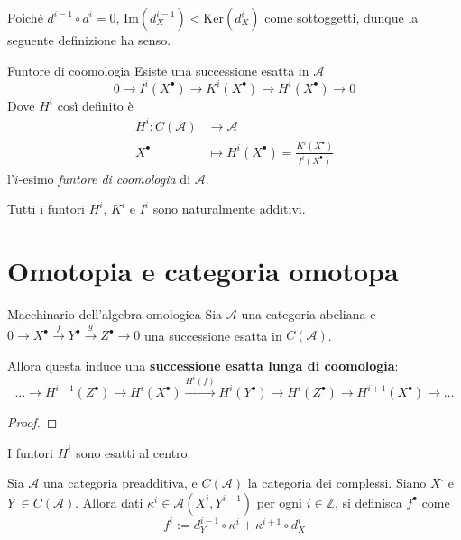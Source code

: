 Poiché \(d^{i-1} \circ d^{i} = 0\), \(\mathrm{Im}{(d_X^{i-1})} <
\mathrm{Ker}{(d_X^{i})}\) come sottoggetti, dunque la seguente definizione ha
senso.
\begin{definition}{Funtore di coomologia}
    Esiste una successione esatta in \(\mathcal{A}\) \[ 0 \to I^{i}{(X^\bullet)}
    \to K^{i}{(X^\bullet)} \to H^{i}{(X^\bullet)} \to 0\]
    Dove \(H^{i}\) così definito è
    \begin{align*}
        H^{i}: C{(\mathcal{A})} &\longrightarrow \mathcal{A} \\
        X^\bullet &\longmapsto H^{i}(X^\bullet) =
        \frac{K^{i}{(X^\bullet)}}{I^{i}{(X^\bullet)}}
    \end{align*}
    l'\(i\)-esimo \emph{funtore di coomologia} di \(\mathcal{A}\).
\end{definition}

\begin{proposition}{}
    Tutti i funtori \(H^{i}\), \(K^{i}\) e \(I^{i}\) sono naturalmente
    additivi.
\end{proposition}


\section{Omotopia e categoria omotopa}

\begin{theorem}{Macchinario dell'algebra omologica}\label{thm:LES}
    Sia \(\mathcal{A}\) una categoria abeliana e \(0 \to X^\bullet
    \overset{f}{\to} Y^\bullet \overset{g}{\to} Z^\bullet \to 0\) una
    successione esatta in \(C{(\mathcal{A})}\).

    Allora questa induce una \textbf{successione esatta lunga di coomologia}:
    \[
      \dots \to H^{i-1}{(Z^\bullet)} \to H^{i}{(X^\bullet)}
      \overset{H^{i}{(f)}}{\to} H^{i}{(Y^\bullet)} \to H^{i}{(Z^\bullet)} \to
      H^{i+1}{(X^\bullet)} \to \dots
    \]
\end{theorem}

\begin{proof}{}
\end{proof}

\begin{corollary}{}
    I funtori \(H^{i}\) sono esatti al centro.
\end{corollary}






Sia \(\mathcal{A}\) una categoria preadditiva, e \(C{(\mathcal{A})}\) la
categoria dei complessi. Siano \(X^{\cdot }\) e \(Y^{\cdot } \in
C{(\mathcal{A})}\). Allora dati \(\kappa^{i} \in \mathcal{A}{(X^{i}, Y^{i-1})}\)
per ogni \(i \in \mathbb{Z}\), si definisca \(f^\bullet\) come
\begin{equation}{}\label{eq:omotopia-complessi}
    f^{i} := d_Y^{i-1} \circ \kappa^{i} + \kappa^{i+1} \circ d_X^{i} 
\end{equation}

